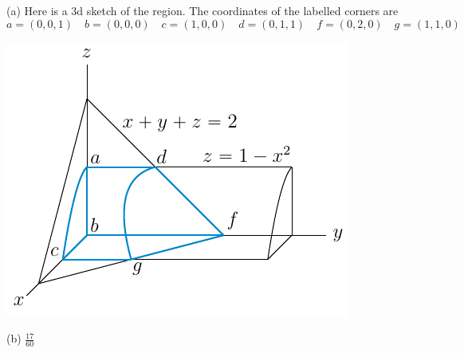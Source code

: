 %

\begin{answer}
(a)
Here is a 3d sketch of the region. The coordinates of the labelled corners are
\begin{equation*}
a=(0,0,1)\quad
b=(0,0,0)\quad
c=(1,0,0)\quad
d=(0,1,1)\quad
f=(0,2,0)\quad
g=(1,1,0)
\end{equation*}
\begin{center}
     \includegraphics{fig/OE01AQ8b.pdf}
\end{center}


(b) $\frac{17}{60}$
\end{answer}


